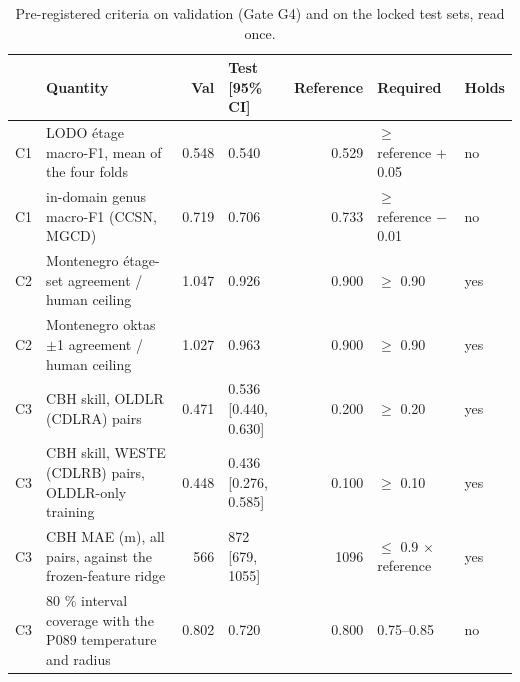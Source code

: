 \begin{table}[t]
\centering
\footnotesize
\begin{tabular}{llrlrll}
\toprule
 & Quantity & Val & Test [95\% CI] & Reference & Required & Holds \\
\midrule
C1 & LODO étage macro-F1, mean of the four folds & 0.548 & 0.540 & 0.529 & $\geq$ reference + 0.05 & no \\
C1 & in-domain genus macro-F1 (CCSN, MGCD) & 0.719 & 0.706 & 0.733 & $\geq$ reference $-$ 0.01 & no \\
C2 & Montenegro étage-set agreement / human ceiling & 1.047 & 0.926 & 0.900 & $\geq$ 0.90 & yes \\
C2 & Montenegro oktas $\pm$1 agreement / human ceiling & 1.027 & 0.963 & 0.900 & $\geq$ 0.90 & yes \\
C3 & CBH skill, OLDLR (CDLRA) pairs & 0.471 & 0.536 [0.440, 0.630] & 0.200 & $\geq$ 0.20 & yes \\
C3 & CBH skill, WESTE (CDLRB) pairs, OLDLR-only training & 0.448 & 0.436 [0.276, 0.585] & 0.100 & $\geq$ 0.10 & yes \\
C3 & CBH MAE (m), all pairs, against the frozen-feature ridge & 566 & 872 [679, 1055] & 1096 & $\leq$ 0.9 $\times$ reference & yes \\
C3 & 80 \% interval coverage with the P089 temperature and radius & 0.802 & 0.720 & 0.800 & 0.75–0.85 & no \\
\bottomrule
\end{tabular}
\caption{Pre-registered criteria on validation (Gate G4) and on the locked test sets, read once.}
\label{tab:criteria}
\end{table}
